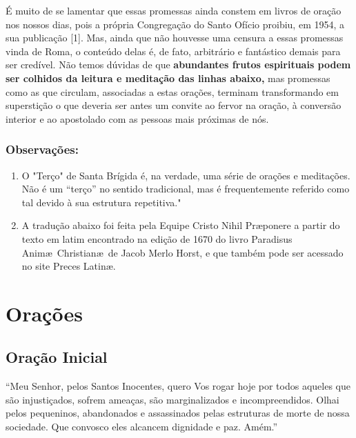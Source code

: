 \documentclass[11pt]{article}
\begin{document}
\begin{justify}
É muito de se lamentar que essas promessas ainda constem em livros de oração nos nossos dias, pois a própria Congregação do Santo Ofício proibiu, em 1954, a sua publicação [1]. Mas, ainda que não houvesse uma censura a essas promessas vinda de Roma, o conteúdo delas é, de fato, arbitrário e fantástico demais para ser credível. Não temos dúvidas de que \textbf{abundantes frutos espirituais podem ser colhidos da leitura e meditação das linhas abaixo,} mas promessas como as que circulam, associadas a estas orações, terminam transformando em superstição o que deveria ser antes um convite ao fervor na oração, à conversão interior e ao apostolado com as pessoas mais próximas de nós.

\hfill

\subsubsection*{Observações:}
\begin{enumerate}
 \item O "Terço" de Santa Brígida é, na verdade, uma série de orações e meditações. Não é um “terço” no sentido tradicional, mas é frequentemente referido como tal devido à sua estrutura repetitiva."
 \item A tradução abaixo foi feita pela Equipe Cristo Nihil Pr\ae ponere a partir do texto em latim encontrado na edição de 1670 do livro Paradisus Anim\ae\ Christian\ae\, de Jacob Merlo Horst, e que também pode ser acessado no site Preces Latinæ.
\end{enumerate}

\end{justify}

\hfill


\newpage


\section{Orações}\label{sec:Orações} %

\subsection{Oração Inicial} %

“Meu Senhor, pelos Santos Inocentes, quero Vos rogar hoje por todos aqueles que são injustiçados, sofrem ameaças, são marginalizados e incompreendidos. Olhai pelos pequeninos, abandonados e assassinados pelas estruturas de morte de nossa sociedade. Que convosco eles alcancem dignidade e paz. Amém.”
\end{document}

